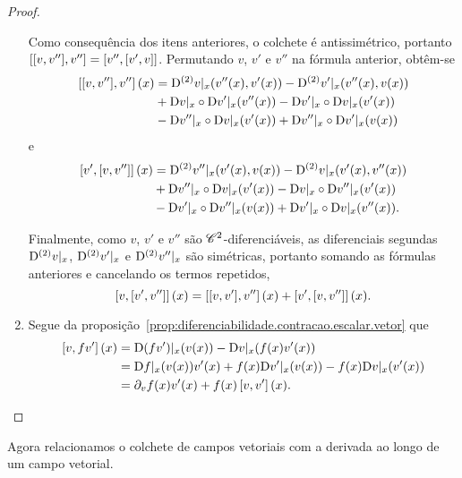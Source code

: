 \begin{proof}
\begin{enumerate}
	Como consequência dos itens anteriores, o colchete é antissimétrico,  portanto $\left[{\left[{v},{v''}\right]},{v''}\right] = \left[{v''},{\left[{v'},{v}\right]}\right]$. Permutando $v$, $v'$ e $v''$ na fórmula anterior, obtêm-se
		\begin{align*}
		\left[{\left[{v},{v''}\right]},{v''}\right](x) &= \mathrm{D}^{(2)} v|_x (v''(x),v'(x)) - \mathrm{D}^{(2)}v'|_x (v''(x),v(x)) \\
			&+ \mathrm{D} v|_x \circ \mathrm{D} v'|_x (v''(x)) - \mathrm{D} v'|_x \circ \mathrm{D} v|_x (v'(x)) \\
			&- \mathrm{D} v''|_x \circ \mathrm{D} v|_x (v'(x)) + \mathrm{D} v''|_x \circ \mathrm{D} v'|_x (v(x))
		\end{align*}
	e
		\begin{align*}
		\left[{v'},{\left[{v},{v''}\right]}\right](x) &= \mathrm{D}^{(2)} v''|_x (v'(x),v(x)) - \mathrm{D}^{(2)}v|_x (v'(x),v''(x)) \\
			&+ \mathrm{D} v''|_x \circ \mathrm{D} v|_x (v'(x)) - \mathrm{D} v|_x \circ \mathrm{D} v''|_x (v'(x)) \\
			&- \mathrm{D} v'|_x \circ \mathrm{D} v''|_x (v(x)) + \mathrm{D} v'|_x \circ \mathrm{D} v|_x (v''(x)).
		\end{align*}
	
	Finalmente, como $v$, $v'$ e $v''$ são $\mathscr{C}^2$-diferenciáveis, as diferenciais segundas $\mathrm{D}^{(2)} v|_x$, $\mathrm{D}^{(2)} v'|_x$ e $\mathrm{D}^{(2)} v''|_x$ são simétricas, portanto somando as fórmulas anteriores e cancelando os termos repetidos,
		\begin{equation*}
		\left[{v},{\left[{v'},{v''}\right]}\right](x) = \left[{\left[{v},{v'}\right]},{v''}\right](x) + \left[{v'},{\left[{v},{v''}\right]}\right](x).
		\end{equation*}
	
	\item Segue da proposição~\ref{prop:diferenciabilidade.contracao.escalar.vetor} que
		\begin{align*}
		\left[{v},{fv'}\right](x) &= \mathrm{D}(fv')|_x(v(x)) - \mathrm{D} v|_x(f(x)v'(x)) \\
			&= \mathrm{D} f|_x(v(x)) v'(x) + f(x) \mathrm{D} v'|_x(v(x)) - f(x) \mathrm{D} v|_x(v'(x)) \\
			&= \partial_{v}f(x) v'(x) + f(x)\left[{v},{v'}\right](x).
		\qedhere
		\end{align*}
\end{enumerate}
\end{proof}




Agora relacionamos o colchete de campos vetoriais com a derivada ao longo de um campo vetorial.

